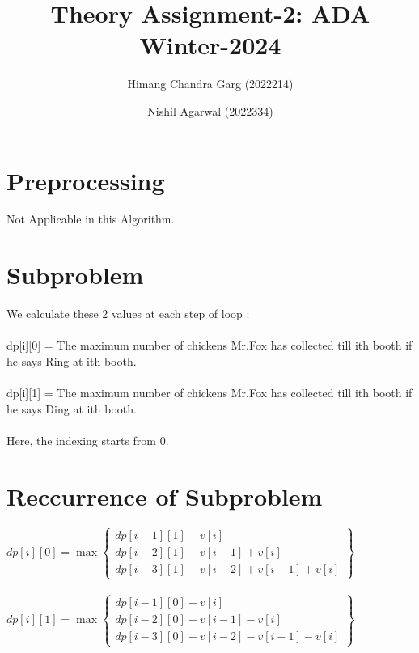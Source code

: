 \documentclass{article}
\title{Theory Assignment-2: ADA Winter-2024}
\author{Himang Chandra Garg (2022214) \and Nishil Agarwal (2022334)}
\date{}
\begin{document}
\maketitle

\section{Preprocessing}
Not Applicable in this Algorithm.

\section{Subproblem}
We calculate these 2 values at each step of loop :\\\\
dp[i][0] = The maximum number of chickens Mr.Fox has collected till ith booth if he says Ring at ith booth.\\\\
dp[i][1] = The maximum number of chickens Mr.Fox has collected till ith booth if he says Ding at ith booth.\\\\
Here, the indexing starts from 0.

\section{Reccurrence of Subproblem }
$dp[i][0] = \max \left\{
\begin{array}{ll}
dp[i - 1][1] + v[i]\\
dp[i - 2][1] + v[i - 1] + v[i]\\
dp[i - 3][1] + v[i - 2] + v[i - 1] + v[i]
\end{array}
\right\}$
\\\\
$dp[i][1] = \max \left\{
\begin{array}{ll}
dp[i - 1][0] - v[i]\\
dp[i - 2][0] - v[i - 1] - v[i]\\
dp[i - 3][0] - v[i - 2] - v[i - 1] - v[i]
\end{array}
\right\}$
\end{document}
